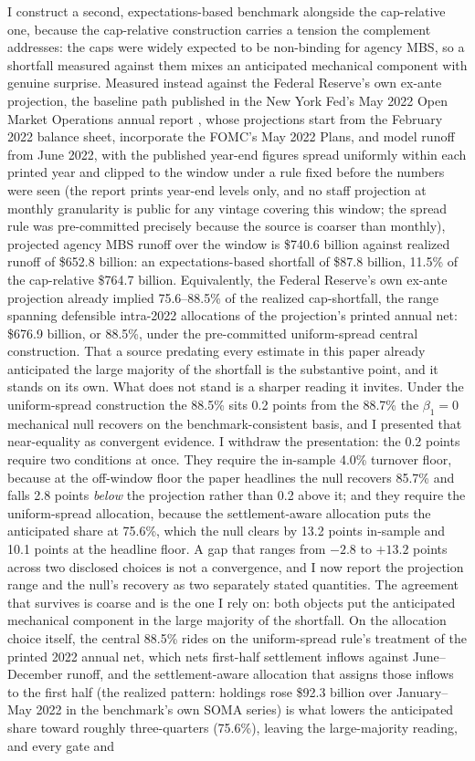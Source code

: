 \documentclass[12pt]{article}
\begin{document}
I construct a second, expectations-based benchmark alongside the cap-relative one, because the cap-relative construction carries a tension the complement addresses: the caps were widely expected to be non-binding for agency MBS, so a shortfall measured against them mixes an anticipated mechanical component with genuine surprise. Measured instead against the Federal Reserve's own ex-ante projection, the baseline path published in the New York Fed's May 2022 Open Market Operations annual report \citep{omo2021}, whose projections start from the February 2022 balance sheet, incorporate the FOMC's May 2022 Plans, and model runoff from June 2022, with the published year-end figures spread uniformly within each printed year and clipped to the window under a rule fixed before the numbers were seen (the report prints year-end levels only, and no staff projection at monthly granularity is public for any vintage covering this window; the spread rule was pre-committed precisely because the source is coarser than monthly), projected agency MBS runoff over the window is \$740.6 billion against realized runoff of \$652.8 billion: an expectations-based shortfall of \$87.8 billion, 11.5\% of the cap-relative \$764.7 billion. Equivalently, the Federal Reserve's own ex-ante projection already implied 75.6--88.5\% of the realized cap-shortfall, the range spanning defensible intra-2022 allocations of the projection's printed annual net: \$676.9 billion, or 88.5\%, under the pre-committed uniform-spread central construction. That a source predating every estimate in this paper already anticipated the large majority of the shortfall is the substantive point, and it stands on its own. What does not stand is a sharper reading it invites. Under the uniform-spread construction the 88.5\% sits 0.2 points from the 88.7\% the $\beta_1 = 0$ mechanical null recovers on the benchmark-consistent basis, and I presented that near-equality as convergent evidence. I withdraw the presentation: the 0.2 points require two conditions at once. They require the in-sample 4.0\% turnover floor, because at the off-window floor the paper headlines the null recovers 85.7\% and falls 2.8 points \emph{below} the projection rather than 0.2 above it; and they require the uniform-spread allocation, because the settlement-aware allocation puts the anticipated share at 75.6\%, which the null clears by 13.2 points in-sample and 10.1 points at the headline floor. A gap that ranges from $-2.8$ to $+13.2$ points across two disclosed choices is not a convergence, and I now report the projection range and the null's recovery as two separately stated quantities. The agreement that survives is coarse and is the one I rely on: both objects put the anticipated mechanical component in the large majority of the shortfall. On the allocation choice itself, the central 88.5\% rides on the uniform-spread rule's treatment of the printed 2022 annual net, which nets first-half settlement inflows against June--December runoff, and the settlement-aware allocation that assigns those inflows to the first half (the realized pattern: holdings rose \$92.3 billion over January--May 2022 in the benchmark's own SOMA series) is what lowers the anticipated share toward roughly three-quarters (75.6\%), leaving the large-majority reading, and every gate and 
\end{document}
